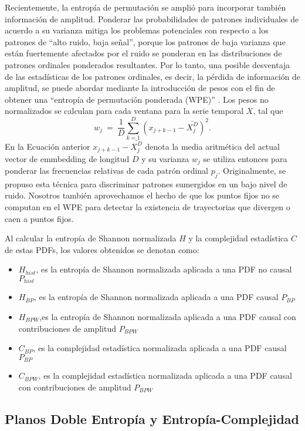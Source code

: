 Recientemente, la entropía de permutación se amplió para incorporar también información de amplitud.
Ponderar las probabilidades de patrones individuales de acuerdo a su varianza mitiga los problemas potenciales con respecto a los patrones de ``alto ruido, baja señal'', porque los patrones de baja varianza que están fuertemente afectados por el ruido se ponderan en las distribuciones de patrones ordinales ponderados resultantes.
Por lo tanto, una posible desventaja de las estadísticas de los patrones ordinales, es decir, la pérdida de información de amplitud, se puede abordar mediante la introducción de pesos con el fin de obtener una ``entropía de permutación ponderada (WPE)'' \cite{Fadlallah2013}.
Los pesos no normalizados se calculan para cada ventana para la serie temporal $X$, tal que
\begin{equation}
\label{WPE_weigth}
w_j~=~\frac{1}{D}\sum_{k=1}^{D} \left(x_{j+k-1}-\bar{X_j^D}\right)^2.
\end{equation}
En la Ecuación anterior $x_{j+k-1}-\bar{X_j^D}$ denota la media aritmética del actual vector de emmbedding de longitud $D$ y su varianza $w_j$ se utiliza entonces para ponderar las frecuencias relativas de cada patrón ordinal $p_j$.
Originalmente, se propuso esta técnica para discriminar patrones sumergidos en un bajo nivel de ruido.
Nosotros también aprovechamos el hecho de que los puntos fijos no se computan en el WPE para detectar la existencia de trayectorias que divergen o caen a puntos fijos.

Al calcular la entropía de Shannon normalizada $H$ y la complejidad estadística $C$ de estas PDFs, los valores obtenidos se denotan como:
\begin{itemize}
	\item $H_{hist}$, es la entropía de Shannon normalizada aplicada a una PDF no causal $P_{hist}$
	\item $H_{BP}$, es la entropía de Shannon normalizada aplicada a una PDF causal $P_{BP}$
	\item $H_{BPW}$,es la entropía de Shannon normalizada aplicada a una PDF causal con contribuciones de amplitud $P_{BPW}$
	\item $C_{BP}$, es la complejidad estadística normalizada aplicada a una PDF causal $P_{BP}$
	\item $C_{BPW}$, es la complejidad estadística normalizada aplicada a una PDF causal con contribuciones de amplitud $P_{BPW} $
\end{itemize}

\subsection{Planos Doble Entropía y Entropía-Complejidad}

